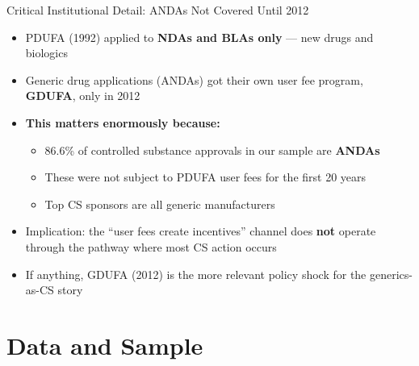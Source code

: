 \documentclass[10pt]{beamer}
\begin{document}
\begin{frame}[t]{Critical Institutional Detail: ANDAs Not Covered Until 2012}
  \begin{itemize}
    \item PDUFA (1992) applied to \textbf{NDAs and BLAs only} --- new drugs
          and biologics
    \item Generic drug applications (ANDAs) got their own user fee program,
          \textbf{GDUFA}, only in \alert{2012}
    \item \textbf{This matters enormously because:}
          \begin{itemize}
            \item 86.6\% of controlled substance approvals in our sample are
                  \textbf{ANDAs}
            \item These were not subject to PDUFA user fees for the first 20
                  years
            \item Top CS sponsors are all generic manufacturers
          \end{itemize}
    \item \alert{Implication:} the ``user fees create incentives'' channel does
          \textbf{not} operate through the pathway where most CS action occurs
    \item If anything, GDUFA (2012) is the more relevant policy shock for the
          generics-as-CS story
  \end{itemize}
\end{frame}

\section{Data and Sample}
\end{document}
